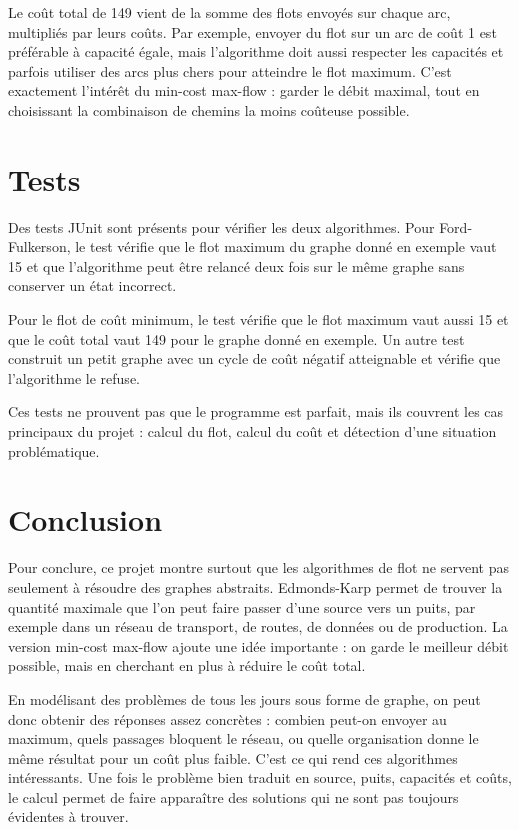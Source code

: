 \documentclass[11pt,a4paper]{article}
\begin{document}
Le coût total de 149 vient de la somme des flots envoyés sur chaque arc,
multipliés par leurs coûts. Par exemple, envoyer du flot sur un arc de coût 1
est préférable à capacité égale, mais l'algorithme doit aussi respecter les
capacités et parfois utiliser des arcs plus chers pour atteindre le flot maximum.
C'est exactement l'intérêt du min-cost max-flow : garder le débit maximal, tout
en choisissant la combinaison de chemins la moins coûteuse possible.

\section{Tests}

Des tests JUnit sont présents pour vérifier les deux algorithmes. Pour
Ford-Fulkerson, le test vérifie que le flot maximum du graphe donné en exemple vaut 15 et que l'algorithme
peut être relancé deux fois sur le même graphe sans conserver un état incorrect.

Pour le flot de coût minimum, le test vérifie que le flot maximum vaut aussi 15
et que le coût total vaut 149 pour le graphe donné en exemple. Un autre test construit un petit graphe avec un
cycle de coût négatif atteignable et vérifie que l'algorithme le refuse.

Ces tests ne prouvent pas que le programme est parfait, mais ils couvrent les
cas principaux du projet : calcul du flot, calcul du coût et détection d'une situation problématique.

\section{Conclusion}

Pour conclure, ce projet montre surtout que les algorithmes de flot ne servent pas seulement à
résoudre des graphes abstraits. Edmonds-Karp permet de trouver la quantité
maximale que l'on peut faire passer d'une source vers un puits, par exemple dans
un réseau de transport, de routes, de données ou de production. La version
min-cost max-flow ajoute une idée importante : on garde le meilleur débit
possible, mais en cherchant en plus à réduire le coût total.

En modélisant des problèmes de tous les jours sous forme de graphe, on peut donc 
obtenir des réponses assez concrètes : combien peut-on envoyer au maximum, quels
passages bloquent le réseau, ou quelle organisation donne le même résultat pour
un coût plus faible. C'est ce qui rend ces algorithmes intéressants. Une fois le
problème bien traduit en source, puits, capacités et coûts, le calcul permet de
faire apparaître des solutions qui ne sont pas toujours évidentes à trouver.
\end{document}
